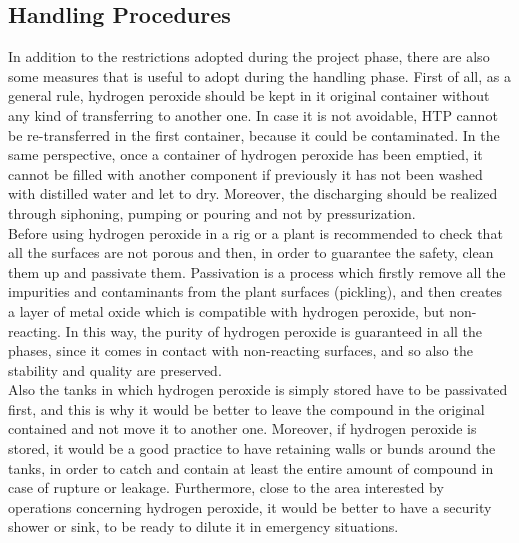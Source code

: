 \documentclass[a4paper]{report}
\begin{document}
\subsection{Handling Procedures}

In addition to the restrictions adopted during the project phase, there are also some measures that is useful to adopt during the handling phase. First of all, as a general rule, hydrogen peroxide should be kept in it original container without any kind of transferring to another one. In case it is not avoidable, HTP cannot be re-transferred in the first container, because it could be contaminated. In the same perspective, once a container of hydrogen peroxide has been emptied, it cannot be filled with another component if previously it has not been washed with distilled water and let to dry. Moreover, the discharging should be realized through siphoning, pumping or pouring and not by pressurization.\\
 Before using hydrogen peroxide in a rig or a plant is recommended to check that all the surfaces are not porous and then, in order to guarantee the safety, clean them up and passivate them. Passivation is a process which firstly remove all the impurities and contaminants from the plant surfaces (pickling), and then creates a layer of metal oxide which is compatible with hydrogen peroxide, but non-reacting. In this way, the purity of hydrogen peroxide is guaranteed in all the phases, since it comes in contact with non-reacting surfaces, and so also the stability and quality are preserved. \\
Also the tanks in which hydrogen peroxide is simply stored have to be passivated first, and this is why it would be better to leave the compound in the original contained and not move it to another one. Moreover, if hydrogen peroxide is stored, it would be a good practice to have retaining walls or bunds around the tanks, in order to catch and contain at least the entire amount of compound in case of rupture or leakage. Furthermore, close to the area interested by operations concerning hydrogen peroxide, it would be better to have a security shower or sink, to be ready to dilute it in emergency situations. \\
\end{document}

